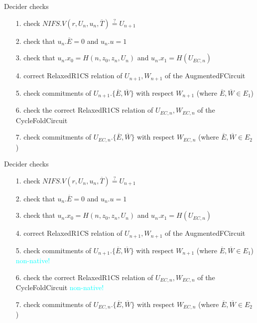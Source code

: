 \documentclass[t]{beamer} \usefonttheme[onlymath]{serif}
\begin{document}
% 
% 
% 

\begin{frame}{Decider checks}
  \begin{enumerate}
    \item[1.] check $NIFS.V(r, U_n, u_n, \overline{T}) \stackrel{?}{=} U_{n+1}$
    \item[2.] check that $u_n.\overline{E}=0$ and $u_n.u=1$
    \item[3.] check that $u_n.x_0 = H(n, z_0, z_n, U_n)$ and $u_n.x_1 = H(U_{EC,n})$
    \item[4.] correct RelaxedR1CS relation of $U_{n+1}, W_{n+1}$ of the AugmentedFCircuit
    \item[5.] check commitments of $U_{n+1}.\{ \overline{E}, \overline{W} \}$ with respect $W_{n+1}$ (where $\overline{E}, \overline{W} \in E_1$)
    \item[6.] check the correct RelaxedR1CS relation of $U_{EC,n}, W_{EC,n}$ of the CycleFoldCircuit
    \item[7.] check commitments of $U_{EC,n}.\{ \overline{E}, \overline{W} \}$ with respect $W_{EC,n}$ (where $\overline{E},\overline{W} \in E_2$)
  \end{enumerate}
\end{frame}

\begin{frame}{Decider checks}
  \begin{enumerate}
    \item[1.] check $NIFS.V(r, U_n, u_n, \overline{T}) \stackrel{?}{=} U_{n+1}$
    \item[2.] check that $u_n.\overline{E}=0$ and $u_n.u=1$
    \item[3.] check that $u_n.x_0 = H(n, z_0, z_n, U_n)$ and $u_n.x_1 = H(U_{EC,n})$
    \item[4.] correct RelaxedR1CS relation of $U_{n+1}, W_{n+1}$ of the AugmentedFCircuit
    \item[5.] check commitments of $U_{n+1}.\{ \overline{E}, \overline{W} \}$ with respect $W_{n+1}$ (where $\overline{E}, \overline{W} \in E_1$) \textcolor{cyan}{non-native!}
    \item[6.] check the correct RelaxedR1CS relation of $U_{EC,n}, W_{EC,n}$ of the CycleFoldCircuit \textcolor{cyan}{non-native!}
    \item[7.] check commitments of $U_{EC,n}.\{ \overline{E}, \overline{W} \}$ with respect $W_{EC,n}$ (where $\overline{E},\overline{W} \in E_2$)
  \end{enumerate}
\end{frame}
\end{document}
